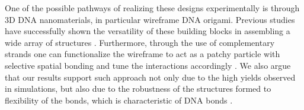 \documentclass[a4paper, amsfonts, amssymb, amsmath, reprint, showkeys, nofootinbib, oneside]{revtex4-1}
\begin{document}

One of the possible pathways of realizing these designs experimentally is through 3D DNA nanomaterials, in particular wireframe DNA origami. Previous studies have successfully shown the versatility of these building blocks in assembling a wide array of structures \cite{Mosayebi2017, Lee2022, Jun2021, Rothemund2006}. Furthermore, through the use of complementary strands one can functionalize the wireframe to act as a patchy particle with selective spatial bonding and tune the interactions accordingly \cite{Biancaniello2005, Wang2015}. We also argue that our results support such approach not only due to the high yields observed in simulations, but also due to the robustness of the structures formed to flexibility of the bonds, which is characteristic of DNA bonds \cite{Meulen2015, Meulen2015, Geerts2010}.


\end{document}
